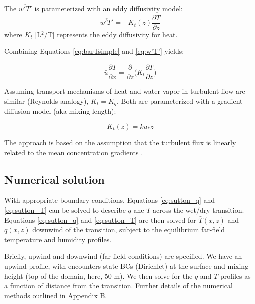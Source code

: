 \documentclass{article}
\begin{document}
    The $\overline {w'T'}$ is parameterized with an eddy diffusivity model:
    \begin{equation}  
    \label{eq:w'T'}
      \overline {w'T'} = - K_t(z) \frac{\partial \bar T}{\partial z} 
    \end{equation} 
    where  $K_t$ [L$^2$/T] represents the eddy diffusivity for heat.  
    
    Combining Equations \ref{eq:barTsimple} and \ref{eq:w'T'} yields: 
    
    \begin{equation}  
      \bar u  \frac{\partial \bar T}{\partial x}  =  
        \frac{\partial}{\partial z} \bigg(  K_t   \frac{\partial \bar T}{\partial z} \bigg)
        \label{eq:sutton_T}
    \end{equation}
    
    
    Assuming transport mechanisms of heat and water vapor in turbulent flow are similar (Reynolds analogy),  $K_t = K_q$.  Both are parameterized with a gradient diffusion model (aka mixing length):
    
    \begin{equation}
    K_t(z) = k u_* z
    \label{eq:K_q_mixing_length}
    \end{equation}
    
    The approach is based on the assumption that the turbulent flux is linearly related to the mean concentration gradients \cite{brutsaert2013evaporation}.
    
    \subsection*{Numerical solution}
    
    
    With appropriate boundary conditions, Equations \ref{eq:sutton_q} and \ref{eq:sutton_T} can be solved to describe $q$ ane $T$ across the wet/dry transition. 
    Equations \ref{eq:sutton_q} and \ref{eq:sutton_T} 
    are then solved for $\bar T(x, z)$ and $\bar q(x, z)$ downwind of the transition, subject to the equilibrium far-field temperature and humidity profiles. 
    
    Briefly, upwind and downwind (far-field conditions) are specified.  We have an upwind profile, with encounters  state BCs (Dirichlet) at the surface and mixing height (top of the domain, here, 50 m). We then solve for the $q$ and $T$ profiles as a function of distance from the transition. Further details of the numerical methods outlined in Appendix B.
    
\end{document}
